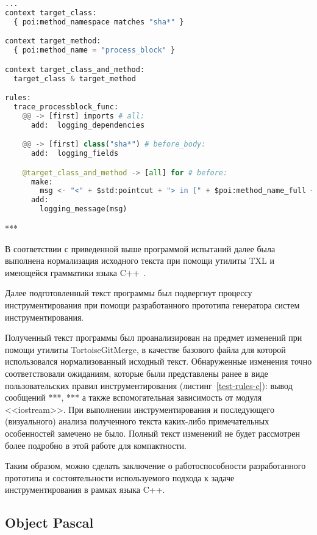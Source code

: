 \begin{lstlisting}[frame=single, language=Python, label={test-rules-c}, caption={Описание правил инструментирования. C++-проект.}]
...
context target_class:
  { poi:method_namespace matches "sha*" }

context target_method:
  { poi:method_name = "process_block" }

context target_class_and_method:
  target_class & target_method

rules:
  trace_processblock_func:
    @@ -> [first] imports # all:
      add:  logging_dependencies

    @@ -> [first] class("sha*") # before_body:
      add:  logging_fields

    @target_class_and_method -> [all] for # before:
      make:
        msg <- "<" + $std:pointcut + "> in [" + $poi:method_name_full + "] method";
      add:
        logging_message(msg)
\end{lstlisting}

***

В соответствии с приведенной выше программой испытаний далее была выполнена нормализация исходного текста при помощи утилиты TXL и имеющейся грамматики языка C++~\cite{txl-resources}.

Далее подготовленный текст программы был подвергнут процессу инструментирования при помощи разработанного прототипа генератора систем инструментирования.

Полученный текст программы был проанализирован на предмет изменений при помощи утилиты TortoiseGitMerge, в качестве базового файла для которой использовался нормализованный исходный текст.
Обнаруженные изменения точно соответствовали ожиданиям, которые были представлены ранее в виде пользовательских правил инструментирования (листинг~\ref{test-rules-c}):
вывод сообщений ***,
***
а также вспомогательная зависимость от модуля <<iostream>>.
При выполнении инструментирования и последующего (визуального) анализа полученного текста каких-либо примечательных особенностей замечено не было.
Полный текст изменений не будет рассмотрен более подробно в этой работе для компактности.

Таким образом, можно сделать заключение о работоспособности разработанного прототипа и состоятельности используемого подхода к задаче инструментирования в рамках языка C++.

\subsection{Object Pascal}

